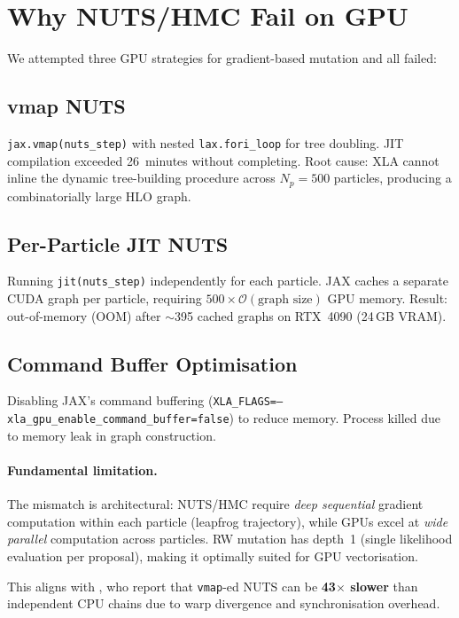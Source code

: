 \documentclass[11pt,a4paper]{article}
\begin{document}
\section{Why NUTS/HMC Fail on GPU}
\label{sec:nuts_failure}

We attempted three GPU strategies for gradient-based mutation and
all failed:

\subsection{vmap NUTS}
\texttt{jax.vmap(nuts\_step)} with nested \texttt{lax.fori\_loop} for
tree doubling.  JIT compilation exceeded 26~minutes without completing.
Root cause: XLA cannot inline the dynamic tree-building procedure across
$N_p = 500$ particles, producing a combinatorially large HLO graph.

\subsection{Per-Particle JIT NUTS}
Running \texttt{jit(nuts\_step)} independently for each particle.
JAX caches a separate CUDA graph per particle, requiring
$500 \times \mathcal{O}(\text{graph size})$ GPU memory.
Result: out-of-memory (OOM) after $\sim$395 cached graphs on RTX~4090
(24\,GB VRAM).

\subsection{Command Buffer Optimisation}
Disabling JAX's command buffering (\texttt{XLA\_FLAGS=--xla\_gpu\_enable\_command\_buffer=false})
to reduce memory.  Process killed due to memory leak in graph construction.

\paragraph{Fundamental limitation.}
The mismatch is architectural: NUTS/HMC require \emph{deep sequential}
gradient computation within each particle (leapfrog trajectory), while
GPUs excel at \emph{wide parallel} computation across particles.
RW mutation has depth~1 (single likelihood evaluation per proposal),
making it optimally suited for GPU vectorisation.

This aligns with \cite{Sountsov2024}, who report that \texttt{vmap}-ed
NUTS can be \textbf{43$\times$ slower} than independent CPU chains due
to warp divergence and synchronisation overhead.
\end{document}
